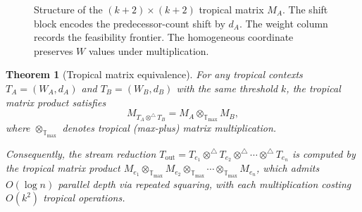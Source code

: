 \documentclass[11pt]{article}
\theoremstyle{plain}
\newtheorem{theorem}{Theorem}[section]
\theoremstyle{definition}
\theoremstyle{remark}
\newcommand{\optrop}{\otimes^{\triangle}}
\newcommand{\Tmax}{\mathbb{T}_{\max}}
\begin{document}
\begin{figure}[t]
\centering
{}
\caption{Structure of the $(k{+}2) \times (k{+}2)$ tropical matrix
  $M_A$.  The shift block encodes the predecessor-count shift by
  $d_A$.  The weight column records the feasibility frontier.  The
  homogeneous coordinate preserves $W$ values under multiplication.}
\label{fig:matrix}
\end{figure}

\begin{theorem}[Tropical matrix equivalence]\label{thm:tropical-matrix}
For any tropical contexts $T_A = (W_A, d_A)$ and $T_B = (W_B, d_B)$
with the same threshold $k$, the tropical matrix product satisfies
\[
  M_{T_A \optrop T_B} = M_A \otimes_{\Tmax} M_B,
\]
where $\otimes_{\Tmax}$ denotes tropical (max-plus) matrix
multiplication.

Consequently, the stream reduction
$T_{\mathrm{out}} = T_{e_1} \optrop T_{e_2} \optrop \cdots \optrop
T_{e_n}$ is computed by the tropical matrix product
$M_{e_1} \otimes_{\Tmax} M_{e_2} \otimes_{\Tmax} \cdots
\otimes_{\Tmax} M_{e_n}$, which admits $O(\log n)$ parallel depth via
repeated squaring, with each multiplication costing $O(k^2)$ tropical
operations.
\end{theorem}
\end{document}
